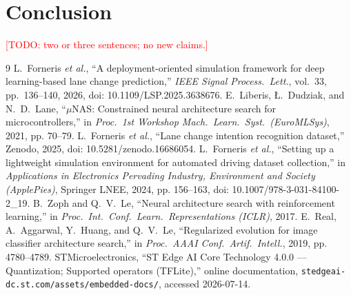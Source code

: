 \documentclass[journal]{IEEEtran}
\newcommand{\todo}[1]{\textcolor{red}{[TODO: #1]}}
\begin{document}
\section{Conclusion}
\todo{two or three sentences; no new claims.}


\begin{thebibliography}{9}
 L.~Forneris \emph{et al.}, ``A deployment-oriented
simulation framework for deep learning-based lane change prediction,''
\emph{IEEE Signal Process.\ Lett.}, vol.~33, pp.~136--140, 2026,
doi: 10.1109/LSP.2025.3638676.
 E.~Liberis, {\L}.~Dudziak, and N.~D.~Lane,
``$\mu$NAS: Constrained neural architecture search for microcontrollers,'' in
\emph{Proc.\ 1st Workshop Mach.\ Learn.\ Syst.\ (EuroMLSys)}, 2021, pp. 70--79.
 L.~Forneris \emph{et al.}, ``Lane change intention
recognition dataset,'' Zenodo, 2025, doi: 10.5281/zenodo.16686054.
 L.~Forneris \emph{et al.}, ``Setting up a
lightweight simulation environment for automated driving dataset
collection,'' in \emph{Applications in Electronics Pervading Industry,
Environment and Society (ApplePies)}, Springer LNEE, 2024, pp. 156--163,
doi: 10.1007/978-3-031-84100-2\_19.
 B.~Zoph and Q.~V.~Le, ``Neural architecture search
with reinforcement learning,'' in \emph{Proc.\ Int.\ Conf.\ Learn.\
Representations (ICLR)}, 2017.
 E.~Real, A.~Aggarwal, Y.~Huang, and Q.~V.~Le,
``Regularized evolution for image classifier architecture search,'' in
\emph{Proc.\ AAAI Conf.\ Artif.\ Intell.}, 2019, pp. 4780--4789.
\bibitem{stedgeai2026} STMicroelectronics, ``ST Edge AI Core Technology 4.0.0
--- Quantization; Supported operators (TFLite),'' online documentation,
\texttt{stedgeai-dc.st.com/assets/embedded-docs/}, accessed 2026-07-14.
\end{thebibliography}
\end{document}
